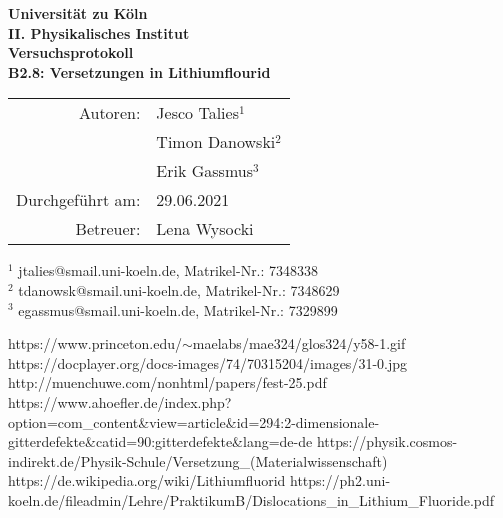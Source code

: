 ﻿\documentclass{article}
\begin{document}
 
 
\thispagestyle{empty}
\vspace*{\fill}
\begin{center}
	\Huge
	\textbf{Universität zu Köln}\\
	\LARGE
	\textbf{II. Physikalisches Institut}\\
	\vspace{2cm}
	\textbf{Versuchsprotokoll}\\  
	\vspace{0.5cm}
	\large
	\textbf{B2.8: Versetzungen in Lithiumflourid}\\
	\normalsize
	\vspace{2cm}
	\begin{tabular}{r l}
		Autoren: 	& Jesco Talies$^1$\\
					& Timon Danowski$^2$\\
                    & Erik Gassmus$^3$\\
		Durchgeführt am:	& 29.06.2021\\
		Betreuer:	& Lena Wysocki
	\end{tabular}
\end{center}
\vfill\footnotesize
$^1$ jtalies@smail.uni-koeln.de, Matrikel-Nr.:  7348338\\
$^2$ tdanowsk@smail.uni-koeln.de, Matrikel-Nr.: 7348629\\
$^3$ egassmus@smail.uni-koeln.de, Matrikel-Nr.: 7329899\\
\normalsize

\newpage
\thispagestyle{empty}
\tableofcontents
\clearpage
\setcounter{page}{1}
  
   
  

%
% 







\begin{thebibliography}{9}
		https://www.princeton.edu/$\sim$maelabs/mae324/glos324/y58-1.gif
		https://docplayer.org/docs-images/74/70315204/images/31-0.jpg
		http://muenchuwe.com/nonhtml/papers/fest-25.pdf
		https://www.ahoefler.de/index.php?option=com\_content\&view=article\&id=294:2-dimensionale-gitterdefekte\&catid=90:gitterdefekte\&lang=de-de
		https://physik.cosmos-indirekt.de/Physik-Schule/Versetzung\_(Materialwissenschaft)
		https://de.wikipedia.org/wiki/Lithiumfluorid
		https://ph2.uni-koeln.de/fileadmin/Lehre/PraktikumB/Dislocations\_in\_Lithium\_Fluoride.pdf
\end{thebibliography} 
\end{document}
